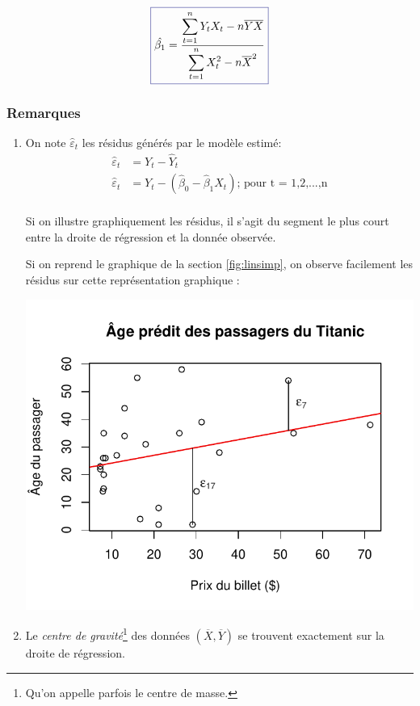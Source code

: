 \documentclass[11pt,french]{report}
\begin{document}
\begin{equation}
\label{eq:beta1}
\color{Blue}
\boxed{\color{black}
\hat{\beta_1} = \frac{\displaystyle\sum_{t=1}^n Y_t X_t - n\overline{Y}\overline{X}}{\displaystyle\sum_{t=1}^n X_t^2 - n\overline{X}^2}
}
\end{equation}

\subsubsection{Remarques}
\label{sec:remarques1}

\begin{enumerate}
\item On note $\hat{\varepsilon}_t$ les résidus générés par le modèle estimé:
\begin{align*}
\hat{\varepsilon}_t &= Y_t - \hat{Y}_t \\
\hat{\varepsilon}_t &= Y_t - (\hat{\beta}_0 - \hat{\beta}_1 X_t) \text{; pour t = 1,2,...,n} \\
\end{align*}

Si on illustre graphiquement les résidus, il s'agit du segment le plus court entre la droite de régression et la donnée observée. 

\bigskip
Si on reprend le graphique de la section \ref{fig:linsimp}, on observe facilement les résidus sur cette représentation graphique :

\includegraphics{notes_de_cours-006}

\item Le \emph{centre de gravité}\footnote{Qu'on appelle parfois le centre de masse.} des données $(\overline{X}, \overline{Y})$ se trouvent exactement sur la droite de régression.
\bigskip


\end{enumerate}
\end{document}
